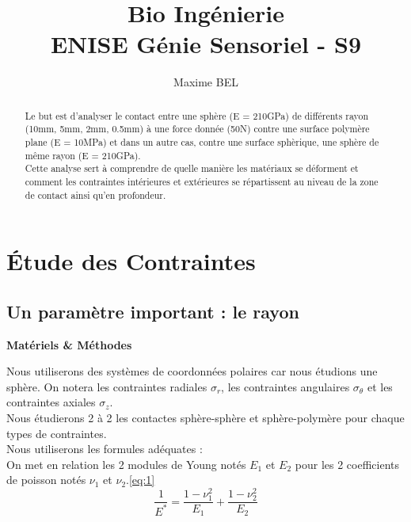\documentclass[a4paper,12pt]{article}
\title{Bio Ingénierie \\
	ENISE Génie Sensoriel - S9}
\author{Maxime BEL}
\begin{document}
	
\maketitle
\tableofcontents
\clearpage


\clearpage
\section{Étude des Contraintes}


\subsection{Un paramètre important : le rayon}





\begin{abstract}
Le but est d'analyser le contact entre une sphère (E = 210GPa) de différents rayon (10mm, 5mm, 2mm, 0.5mm) à une force donnée (50N) contre une surface polymère plane (E = 10MPa) et dans un autre cas, contre une surface sphèrique, une sphère de même rayon (E = 210GPa).\\
Cette analyse sert à comprendre de quelle manière les matériaux se déforment et comment les contraintes intérieures et extérieures se répartissent au niveau de la zone de contact ainsi qu'en profondeur.\\
\end{abstract}

\begin{center}
	\textbf{Matériels \& Méthodes}
\end{center}

Nous utiliserons des systèmes de coordonnées polaires car nous étudions une sphère. On notera les contraintes radiales $\sigma_{r}$, les contraintes angulaires $\sigma_{\theta}$ et les contraintes axiales $\sigma_{z}$.\\
Nous étudierons 2 à 2 les contactes sphère-sphère et sphère-polymère pour chaque types de contraintes.
\bigskip
\\
Nous utiliserons les formules adéquates :\\
On met en relation les 2 modules de Young notés $E_1$ et $E_2$ pour les 2 coefficients de poisson notés $\nu_1$ et $\nu_2$.\eqref{eq:1}\\
\begin{equation}
	\frac{1}{E^*} = \frac{1 - \nu_1^2}{E_1} + \frac{1 - \nu_2^2}{E_2}
	\label{eq:1}
\end{equation}
\end{document}
